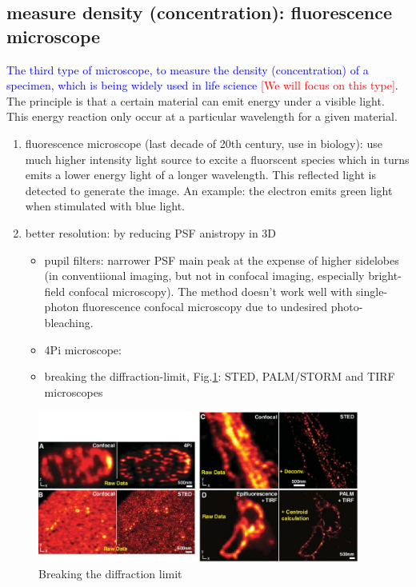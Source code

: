 \subsection{measure density (concentration): fluorescence microscope}

\textcolor{blue}{The third type of microscope, to measure the density
(concentration) of a specimen, which is being widely used in life science}
\textcolor{red}{[We will focus on this type]}. The principle is that a certain
material can emit energy under a visible light. This energy reaction only occur
at a particular wavelength for  a given material.

\begin{enumerate}
  \item fluorescence microscope (last decade of 20th century, use in
  biology):  use much higher intensity light source to excite a fluorscent
  species which in  turns emits a lower energy light of a longer wavelength.
  This reflected light is detected to generate the image. An example: the
  electron emits green light when stimulated with blue light.
     
 \item better resolution: by reducing PSF anistropy in 3D 
 \begin{itemize}
   \item pupil filters: narrower PSF main peak at the expense of higher
   sidelobes (in conventiional imaging, but not in confocal imaging, especially
   bright-field confocal microscopy\cite{martinez-corral2003}). The method
   doesn't work well with single-photon fluorescence confocal microscopy due to
   undesired photo-bleaching.
     \item 4Pi microscope:    
  \item breaking the diffraction-limit, Fig.\ref{fig:diffraction_limit}: STED,
  PALM/STORM and TIRF microscopes
 \end{itemize}
\end{enumerate}

\begin{figure}[hbt]
  \centerline{\includegraphics[height=5cm,
    angle=0]{./images/diffraction_limit.eps}}
  \caption{Breaking the diffraction limit}
  \label{fig:diffraction_limit}
\end{figure}


